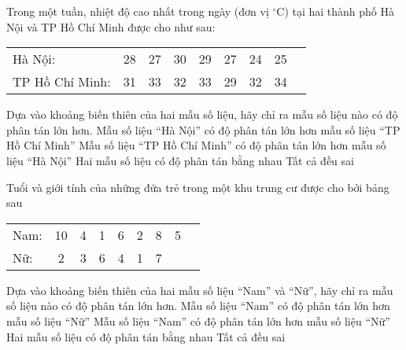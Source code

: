 \begin{ex}%
	Trong một tuần, nhiệt độ cao nhất trong ngày (đơn vị $^\circ$C) tại hai thành phố Hà Nội và TP Hồ Chí Minh được cho như sau:
	\begin{longtable}{p{3.5cm}cccccccc}
		Hà Nội: & 28 & 27 & 30 & 29 & 27 & 24 & 25\\
		TP Hồ Chí Minh: & 31 & 33 & 32 & 33 & 29 & 32 & 34\\
	\end{longtable}
	Dựa vào khoảng biến thiên của hai mẫu số liệu, hãy chỉ ra mẫu số liệu nào có độ phân tán lớn hơn.
	\choice
	{\True Mẫu số liệu ``Hà Nội'' có độ phân tán lớn hơn mẫu số liệu ``TP Hồ Chí Minh''}
	{Mẫu số liệu ``TP Hồ Chí Minh'' có độ phân tán lớn hơn mẫu số liệu ``Hà Nội''}
	{Hai mẫu số liệu có độ phân tán bằng nhau}
	{Tất cả đều sai}
\end{ex}

\begin{ex}%
	Tuổi và giới tính của những đứa trẻ trong một khu trung cư được cho bởi bảng sau
	\begin{longtable}{p{1.5cm}cccccccc}
		Nam: & 10 & 4 & 1 & 6 & 2 & 8 & 5\\
		Nữ: & 2 & 3 & 6 & 4 & 1 & 7 & \\
	\end{longtable}
	Dựa vào khoảng biến thiên của hai mẫu số liệu ``Nam'' và ``Nữ'', hãy chỉ ra mẫu số liệu nào có độ phân tán lớn hơn.
	\choice
	{\True Mẫu số liệu ``Nam'' có độ phân tán lớn hơn mẫu số liệu ``Nữ''}
	{Mẫu số liệu ``Nam'' có độ phân tán lớn hơn mẫu số liệu ``Nữ''}
	{Hai mẫu số liệu có độ phân tán bằng nhau}
	{Tất cả đều sai}
\end{ex}

